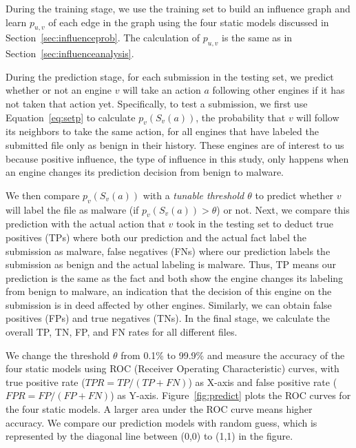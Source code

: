 During the training stage, we use the training set to build an influence graph and
learn $p_{u,v}$ of each edge in the graph using the four static models discussed in Section~\ref{sec:influenceprob}.
The calculation of $p_{u,v}$ is the same as in Section~\ref{sec:influenceanalysis}.

During the prediction stage, for each submission in the testing set, 
we predict whether or not an engine $v$ will take an action $a$ following other engines 
if it has not taken that action yet. 
Specifically, to test a submission, we first use Equation~\ref{eq:setp} to
calculate $p_v(S_v(a))$, the probability that $v$ will follow its neighbors to take the same action, 
for all engines that have labeled the submitted file only as benign in their history. 
These engines are of interest to us because positive influence, 
the type of influence in this study, only happens 
when an engine changes its prediction decision from benign to malware.

We then compare $p_v(S_v(a))$ with a {\em tunable threshold $\theta$} to predict whether $v$ will label the file as malware (if $p_v(S_v(a))>\theta$) or not.
Next, we compare this prediction with the actual action that $v$ took in the testing set to deduct true positives (TPs) where both our prediction 
and the actual fact label the submission as malware, 
false negatives (FNs) where our prediction labels the submission as benign and the actual labeling is malware. 
Thus, TP means our prediction is the same as the fact 
and both show the engine changes its labeling from benign to malware, an indication that the decision 
of this engine on the submission is in deed affected by other engines.
Similarly, we can obtain false positives (FPs) 
and true negatives (TNs).
In the final stage, we calculate the overall TP, TN, FP, and FN rates for all different files.



We change the threshold $\theta$ from 0.1\% to 99.9\% 
and measure the accuracy of the four static models using ROC (Receiver Operating Characteristic) curves,
with true positive rate ($TPR = TP/(TP+FN)$) as X-axis
and false positive rate ($FPR = FP/(FP + FN)$) as Y-axis. 
Figure~\ref{fig:predict} plots the ROC curves for the four static models.
A larger area under the ROC curve means higher accuracy.
We compare our prediction models with random guess, 
which is represented by the diagonal line between (0,0) to (1,1) in the figure. 

